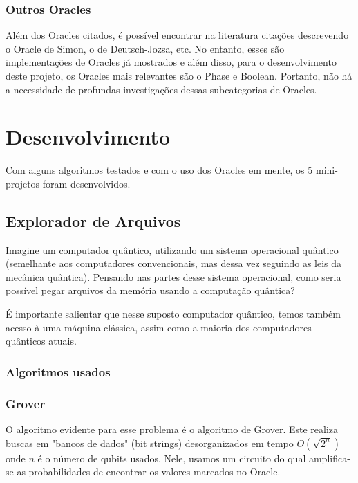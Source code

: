 \documentclass{article}
\begin{document}
\subsubsection{Outros Oracles}
Além dos Oracles citados, é possível encontrar na literatura citações descrevendo o Oracle de Simon, o de Deutsch-Jozsa, etc. No entanto, esses são implementações de Oracles já mostrados e além disso, para o desenvolvimento deste projeto, os Oracles mais relevantes são o Phase e Boolean. Portanto, não há a necessidade de profundas investigações dessas subcategorias de Oracles.


\section{Desenvolvimento}

Com alguns algoritmos testados e com o uso dos Oracles em mente, os 5 mini-projetos foram desenvolvidos.

\subsection{Explorador de Arquivos} \label{file-explorer}

Imagine um computador quântico, utilizando um sistema operacional quântico (semelhante aos computadores convencionais, mas dessa vez seguindo as leis da mecânica quântica). Pensando nas partes desse sistema operacional, como seria possível pegar arquivos da memória usando a computação quântica?

É importante salientar que nesse suposto computador quântico, temos também acesso à uma máquina clássica, assim como a maioria dos computadores quânticos atuais.

\subsubsection{Algoritmos usados}

\subsubsection{Grover}

O algoritmo evidente para esse problema é o algoritmo de Grover. Este realiza buscas em "bancos de dados" (bit strings) desorganizados em tempo $O(\sqrt{2^n})$ onde $n$ é o número de qubits usados. 
Nele, usamos um circuito do qual amplifica-se as probabilidades de encontrar os valores marcados no Oracle.
\end{document}
